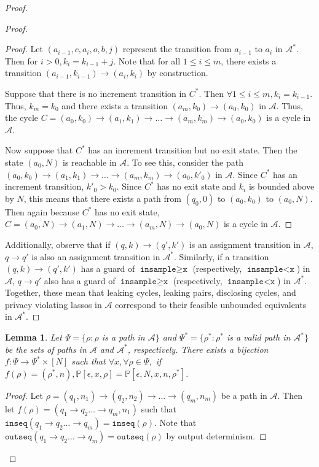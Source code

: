 \documentclass[12pt]{article}
\newcommand{\PP}{\mathbb{P}}
\newcommand{\gguard}{\texttt{insample}\geq \texttt{x}}
\newcommand{\lguard}{\texttt{insample} < \texttt{x}}
\newtheorem{lemma}[thm]{Lemma}
\theoremstyle{definition}
\begin{document}
\begin{proof}
\begin{proof}
\begin{proof}
		Let $(a_{i-1}, c, a_i, o, b, j)$ represent the transition from $a_{i-1}$ to $a_i$ in $\mathcal{A}^*$. Then for $i > 0, k_i = k_{i-1} + j$. Note that for all $1 \leq i\leq m$, there exists a transition $(a_{i-1}, k_{i-1}) \to (a_i, k_i)$ by construction.

		Suppose that there is no increment transition in $C^*$. Then $\forall 1\leq i \leq m, k_i = k_{i-1}$. Thus, $k_m = k_0$ and there exists a transition $(a_m, k_0)\to (a_0, k_0)$ in $\mathcal{A}$. Thus, the cycle $C = (a_0, k_0)\to (a_1, k_1)\to \ldots\to (a_m, k_m) \to (a_0, k_0)$ is a cycle in $\mathcal{A}$.

		Now suppose that $C^*$ has an increment transition but no exit state. Then the state $(a_0, N)$ is reachable in $\mathcal{A}$. To see this, consider the path $(a_0, k_0)\to (a_1, k_1)\to \ldots\to (a_m, k_m) \to (a_0, k'_0)$ in $\mathcal{A}$. Since $C^*$ has an increment transition, $k'_0 > k_0$. 
		Since $C^*$ has no exit state and $k_i$ is bounded above by $N$, this means that there exists a path from $(q_0, 0)$ to $(a_0, k_0)$ to $(a_0, N)$. Then again because $C^*$ has no exit state, $C = (a_0, N)\to (a_1, N)\to \ldots\to (a_m, N) \to (a_0, N)$ is a cycle in $\mathcal{A}$.
	\end{proof}

	Additionally, observe that if $(q, k)\to (q', k')$ is an assignment transition in $\mathcal{A}$, $q \to q'$ is also an assignment transition in $\mathcal{A}^*$. 
	Similarly, if a transition $(q, k)\to (q', k')$ has a guard of $\gguard$ (respectively, $\lguard$) in $\mathcal{A}$, $q\to q'$ also has a guard of $\gguard$ (respectively, $\lguard$) in $\mathcal{A}^*$. Together, these mean that leaking cycles, leaking pairs, disclosing cycles, and privacy violating lassos in $\mathcal{A}$ correspond to their feasible unbounded equivalents in $\mathcal{A}^*$.

\end{proof}

\begin{lemma}\label{pathequivalence}
	Let $\Psi = \{\rho: \rho$ is a path in $\mathcal{A}\}$ and $\Psi^* = \{\rho^*: \rho^*$ is a valid path in $\mathcal{A}^*\}$ be the sets of paths in $\mathcal{A}$ and $\mathcal{A}^*$, respectively. There exists a bijection $f: \Psi\to \Psi^*\times [N]$ such that $\forall x, \forall \rho\in \Psi,$ if $f(\rho) = (\rho^*, n), \PP[\epsilon, x, \rho] = \PP[\epsilon, N, x, n, \rho^*]$.
\end{lemma}

\begin{proof}
	Let $\rho = (q_1, n_1)\to(q_2, n_2)\to \ldots \to (q_m, n_m)$ be a path in $\mathcal{A}$. Then let $f(\rho) = (q_1\to q_2\ldots \to q_m, n_1)$ such that $\texttt{inseq}(q_1\to q_2\ldots \to q_m) = \texttt{inseq}(\rho)$. Note that $\texttt{outseq}(q_1\to q_2\ldots \to q_m) = \texttt{outseq}(\rho)$ by output determinism.
	

\end{proof}
\end{proof}
\end{document}
